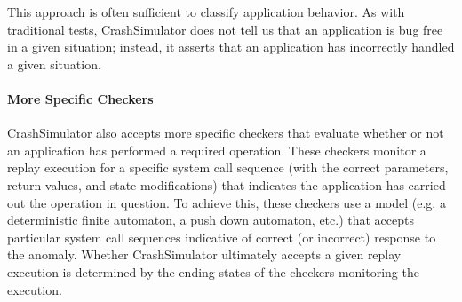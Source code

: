     This approach is often sufficient to classify application behavior. %
    As
    with traditional tests, CrashSimulator does not tell us that an application is
    bug free in a given situation; instead, it asserts that an application
    has incorrectly handled a given situation.
    

    \paragraph{More Specific Checkers}

    CrashSimulator also accepts more specific checkers that evaluate whether or
    not an application has performed a required operation.  These checkers
    monitor a replay execution for a specific system call sequence (with the
    correct parameters, return values, and state modifications) that indicates
    the application has carried out the operation in question.  To achieve this,
    these checkers use a model (e.g. a deterministic finite
    automaton, a push down automaton, etc.) that accepts particular system
    call sequences indicative of correct (or incorrect) response
    to the anomaly.  Whether CrashSimulator
    ultimately accepts a given replay execution is determined by the ending
    states of the checkers monitoring the execution.


    
